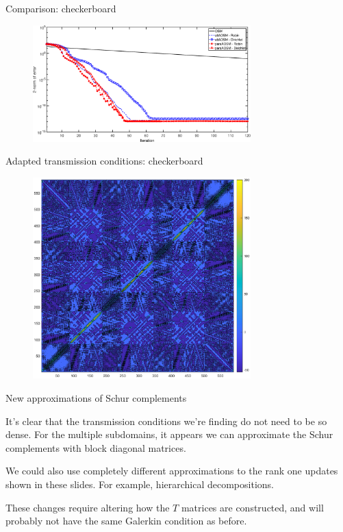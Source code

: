 \documentclass{beamer}
\begin{document}
\begin{frame}{Comparison: checkerboard}
\begin{figure}
	\centering
	\includegraphics[width=0.75\textwidth]{AOSM/PLOT_AOSMConv_Checkerboard.eps}
\end{figure}
\end{frame}

\begin{frame}{Adapted transmission conditions: checkerboard}
\begin{figure}
	\centering
	\includegraphics[width=0.75\textwidth]{AOSM/PLOT_AOSMConv_Checkerboard_T.eps}
\end{figure}
\end{frame}

\begin{frame}{New approximations of Schur complements}

It's clear that the transmission conditions we're finding do not need to be so dense.
For the multiple subdomains, it appears we can approximate the Schur complements with block diagonal matrices.

We could also use completely different approximations to the rank one updates shown in these slides.
For example, hierarchical decompositions.

These changes require altering how the $T$ matrices are constructed, and will probably not have the same Galerkin condition as before.
\end{frame}
\end{document}
